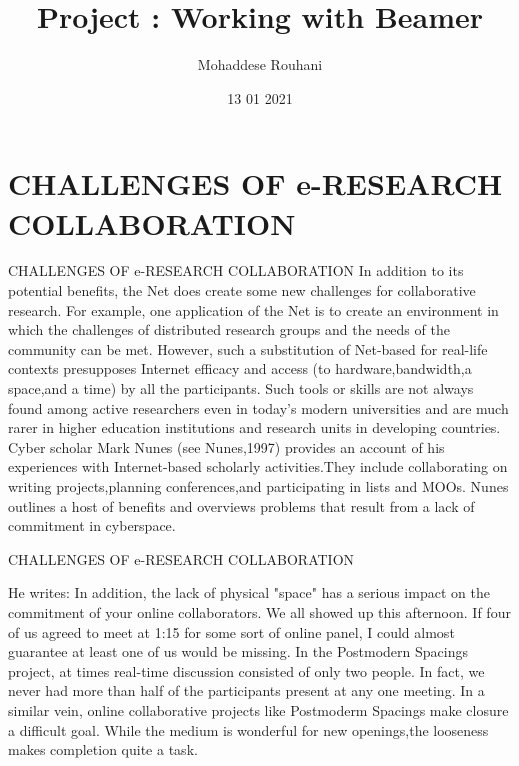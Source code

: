 \documentclass{beamer}
\title{Project : Working with Beamer}
\author{Mohaddese Rouhani}
\institute{PNU}
\date{13 01 2021}
\begin{document}
\justify

\begin{frame}
	\maketitle 
\end{frame}


\section{CHALLENGES OF e-RESEARCH \\COLLABORATION}


\begin{frame}[t]{CHALLENGES OF e-RESEARCH COLLABORATION}
	In addition to its potential benefits, the Net does create some new challenges for collaborative research. For example, one application of the Net is to create an environment in which the challenges of distributed research groups and the needs of the
	community can be met. However, such a substitution of Net-based for real-life contexts presupposes Internet efficacy and access (to hardware,bandwidth,a space,and a
	time) by all the participants. Such tools or skills are not always found among active
	researchers even in today's modern universities and are much rarer in higher education
	institutions and research units in developing countries.
	Cyber scholar Mark Nunes (see Nunes,1997) provides an account of his experiences with Internet-based scholarly activities.They include collaborating on writing
	projects,planning conferences,and participating in lists and MOOs. Nunes outlines a
	host of benefits and overviews problems that result from a lack of commitment in
	cyberspace.
\end{frame}


\begin{frame}[t]{CHALLENGES OF e-RESEARCH COLLABORATION}
	\begin{block}{He writes:}
		In addition, the lack of physical "space" has a serious impact on the commitment of your online collaborators. We all showed up this afternoon. If four of us agreed to meet at 1:15 for some sort of online panel, I could almost guarantee at least one of us would be missing. In the Postmodern Spacings project, at times real-time discussion consisted of only two people. In fact, we never had more than half of the participants present at any one meeting. In a similar vein, online collaborative projects like Postmoderm Spacings make closure a difficult goal. While the medium is wonderful for new openings,the looseness makes completion quite a task.
	\end{block}
\end{frame}
\end{document}
